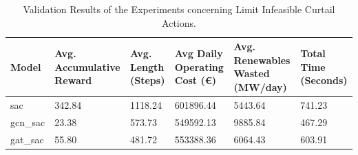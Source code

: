 	\begin{table}[ht]
		\centering
		\begin{tabularx}{\textwidth}{|l|X|X|X|X|X|}
			\hline
			\textbf{Model} & \textbf{Avg. Accumulative Reward}& \textbf{Avg. Length (Steps)} & \textbf{Avg Daily Operating Cost (€)} & \textbf{Avg. Renewables Wasted (MW/day)} & \textbf{Total Time (Seconds)}\\
			\hline
			sac & 342.84 & 1118.24 & 601896.44 & 5443.64 & 741.23 \\
			gcn\_sac & 23.38 & 573.73 & 549592.13 & 9885.84 & 467.29 \\
			gat\_sac & 55.80 & 481.72  & 553388.36 & 6064.43 & 603.91 \\
			\hline
		\end{tabularx}
		\caption{Validation Results of the Experiments concerning Limit Infeasible Curtail Actions.}
		\label{fig:curtail-val}
	\end{table}

